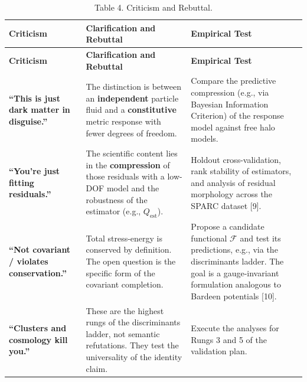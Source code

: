 \begin{longtable}[]{@{}
  >{\raggedright\arraybackslash}p{}
  >{\raggedright\arraybackslash}p{}
  >{\raggedright\arraybackslash}p{}@{}}
\caption{\protect{}\label{_Toc222952634}{}Table 4. Criticism and Rebuttal.}\tabularnewline
\toprule\noalign{}
\begin{minipage}[b]{\linewidth}\centering
\textbf{Criticism}
\end{minipage} & \begin{minipage}[b]{\linewidth}\centering
\textbf{Clarification and Rebuttal}
\end{minipage} & \begin{minipage}[b]{\linewidth}\centering
\textbf{Empirical Test}
\end{minipage} \\
\midrule\noalign{}
\endfirsthead
\toprule\noalign{}
\begin{minipage}[b]{\linewidth}\centering
\textbf{Criticism}
\end{minipage} & \begin{minipage}[b]{\linewidth}\centering
\textbf{Clarification and Rebuttal}
\end{minipage} & \begin{minipage}[b]{\linewidth}\centering
\textbf{Empirical Test}
\end{minipage} \\
\midrule\noalign{}
\endhead
\bottomrule\noalign{}
\endlastfoot
\textbf{``This is just dark matter in disguise.''} & The distinction is between an \textbf{independent} particle fluid and a \textbf{constitutive} metric response with fewer degrees of freedom. & Compare the predictive compression (e.g., via Bayesian Information Criterion) of the response model against free halo models. \\
\textbf{``You're just fitting residuals.''} & The scientific content lies in the \textbf{compression} of those residuals with a low-DOF model and the robustness of the estimator (e.g., \(Q_{\text{est}}\)). & Holdout cross-validation, rank stability of estimators, and analysis of residual morphology across the SPARC dataset {[}9{]}. \\
\textbf{``Not covariant / violates conservation.''} & Total stress-energy is conserved by definition. The open question is the specific form of the covariant completion. & Propose a candidate functional \(\mathcal{F}\) and test its predictions, e.g., via the discriminants ladder. The goal is a gauge-invariant formulation analogous to Bardeen potentials {[}10{]}. \\
\textbf{``Clusters and cosmology kill you.''} & These are the highest rungs of the discriminants ladder, not semantic refutations. They test the universality of the identity claim. & Execute the analyses for Rungs 3 and 5 of the validation plan. \\
\end{longtable}

